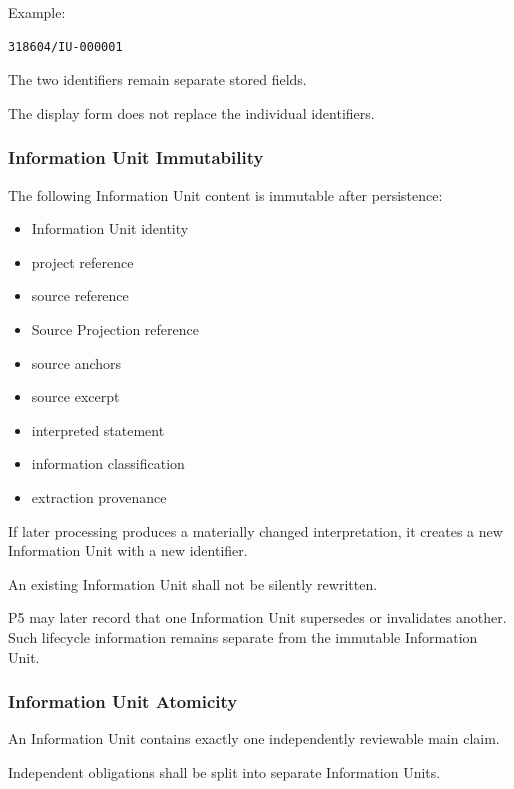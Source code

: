 Example:

\begin{verbatim}
318604/IU-000001
\end{verbatim}

The two identifiers remain separate stored fields.

The display form does not replace the individual identifiers.

\hypertarget{information-unit-immutability}{%
\subsubsection{Information Unit Immutability}\label{information-unit-immutability}}

The following Information Unit content is immutable after persistence:

\begin{itemize}
\tightlist
\item
  Information Unit identity
\item
  project reference
\item
  source reference
\item
  Source Projection reference
\item
  source anchors
\item
  source excerpt
\item
  interpreted statement
\item
  information classification
\item
  extraction provenance
\end{itemize}

If later processing produces a materially changed interpretation, it creates a new Information Unit with a new identifier.

An existing Information Unit shall not be silently rewritten.

P5 may later record that one Information Unit supersedes or invalidates another. Such lifecycle information remains separate from the immutable Information Unit.

\hypertarget{information-unit-atomicity}{%
\subsubsection{Information Unit Atomicity}\label{information-unit-atomicity}}

An Information Unit contains exactly one independently reviewable main claim.

Independent obligations shall be split into separate Information Units.


